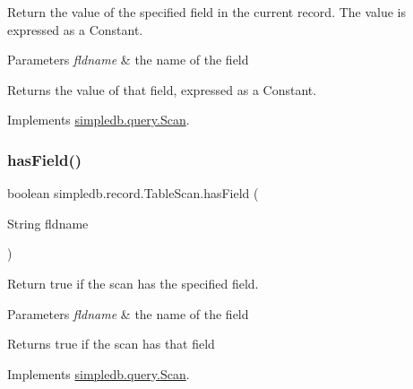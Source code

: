 Return the value of the specified field in the current record. The value is expressed as a Constant. 
\begin{DoxyParams}{Parameters}
{\em fldname} & the name of the field \\
\hline
\end{DoxyParams}
\begin{DoxyReturn}{Returns}
the value of that field, expressed as a Constant. 
\end{DoxyReturn}


Implements \hyperlink{interfacesimpledb_1_1query_1_1Scan_aca80bca2857c983a88834bf6c01ee5ca}{simpledb.\+query.\+Scan}.

\mbox{\label{classsimpledb_1_1record_1_1TableScan_aad90f69cc2d14ecfe8a7854e8ed60548}} 
\subsubsection{\texorpdfstring{has\+Field()}{hasField()}}
{\footnotesize\ttfamily boolean simpledb.\+record.\+Table\+Scan.\+has\+Field (\begin{DoxyParamCaption}\item[{String}]{fldname }\end{DoxyParamCaption})\hspace{0.3cm}{\ttfamily [inline]}}

Return true if the scan has the specified field. 
\begin{DoxyParams}{Parameters}
{\em fldname} & the name of the field \\
\hline
\end{DoxyParams}
\begin{DoxyReturn}{Returns}
true if the scan has that field 
\end{DoxyReturn}


Implements \hyperlink{interfacesimpledb_1_1query_1_1Scan_a8f4ccf13eed0bed983c928e9b998fe5c}{simpledb.\+query.\+Scan}.

\mbox{\label{classsimpledb_1_1record_1_1TableScan_a45f93916b026b51b1511ba2610630564}} 
